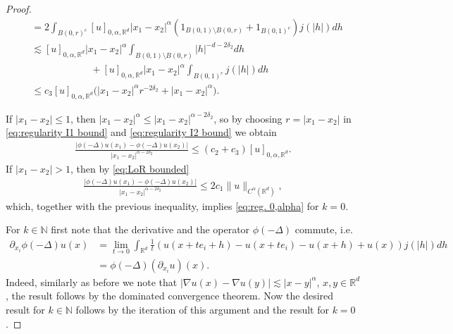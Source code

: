 \documentclass[10pt,a4paper]{amsart}
\newcommand{\LoR}{\phi(-\Delta)}
\newcommand{\N}{\mathbb{N}}
\newcommand{\R}{\mathbb{R}}
\begin{document}
\begin{proof}
\begin{align}
        &=2\int_{B(0,r)^c} [u]_{0,\alpha,\R^d}|x_1-x_2|^\alpha (1_{B(0,1)\setminus B(0,r)}+1_{B(0,1)^c})j(|h|)dh\nonumber\\
        &\lesssim  [u]_{0,\alpha,\R^d}|x_1-x_2|^\alpha \int_{B(0,1)\setminus B(0,r)}|h|^{-d-2\delta_2}dh\nonumber\\&
        \hspace{6em}
        + [u]_{0,\alpha,\R^d}|x_1-x_2|^\alpha\int_{B(0,1)^c}j(|h|)dh\nonumber\\
        &\le c_3[u]_{0,\alpha,\R^d}\big(|x_1-x_2|^\alpha r^{-2\delta_2}+|x_1-x_2|^\alpha\big).\label{eq:regularity I2 bound}
    \end{align}
   
    
    If $|x_1-x_2|\le 1$, then $|x_1-x_2|^\alpha\le |x_1-x_2|^{\alpha-2\delta_2}$, so by choosing $r=|x_1-x_2|$ in \eqref{eq:regularity I1 bound} and \eqref{eq:regularity I2 bound} we obtain
    \begin{align*}
        \frac{|\LoR u(x_1)-\LoR u(x_2)|}{|x_1-x_2|^{\alpha-2\delta_2}}\le (c_2+c_3) [u]_{0,\alpha,\R^d}.
    \end{align*}
   If $|x_1-x_2|> 1$, then by \eqref{eq:LoR bounded} 
    \begin{align*}
        \frac{|\LoR u(x_1)-\LoR u(x_2)|}{|x_1-x_2|^{\alpha-2\delta_2}}\le  2c_1\|u\|_{C^\alpha(\R^d)},
    \end{align*}
 which, together with the previous inequality, implies \eqref{eq:reg. 0,alpha} for $k=0$.

For $k\in \N$ first note that the derivative and the operator $\LoR$ commute, i.e.
    \begin{align*}
        \partial_{x_i}\LoR u(x)&=\lim_{t\to 0}\int_{\R^d}\frac 1 t (u(x+te_i+h)-u(x+te_i)-u(x+h)+u(x))j(|h|)dh\\
        &= \LoR (\partial_{x_i}u)(x).
    \end{align*}
 Indeed, similarly as before
we note that $|\nabla u(x)-\nabla u(y)|\lesssim |x-y|^\alpha$, $x,y\in\R^d$, the result follows by the dominated convergence theorem. Now the desired result for $k\in \N$ follows by the iteration of this argument and the result for $k=0$. 
\end{proof}
\end{document}
